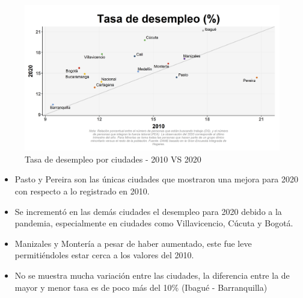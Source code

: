     \begin{figure}[H]
        \caption{Tasa de desempleo por ciudades - 2010 VS 2020 \label{map_result_2} }
        \begin{center}
        \includegraphics[width=\textwidth,keepaspectratio]{img/var_45_scatter_time.png}
        \end{center}
    \end{figure}
            \begin{itemize}
                \item Pasto y Pereira son las únicas ciudades que mostraron una mejora para 2020 con respecto a lo registrado en 2010.
                \item Se incrementó en las demás ciudades el desempleo para 2020 debido a la pandemia, especialmente en ciudades como Villavicencio, Cúcuta y Bogotá.
                \item Manizales y Montería a pesar de haber aumentado, este fue leve permitiéndoles estar cerca a los valores del 2010.
                \item No se muestra mucha variación entre las ciudades, la diferencia entre la de mayor y menor tasa es de poco más del 10\% (Ibagué - Barranquilla)
                \end{itemize}

